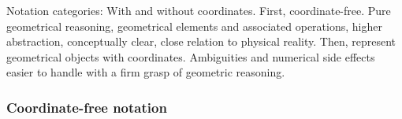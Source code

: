 %
%
%
%
% 
%

 Notation categories: With and without coordinates. First, coordinate-free. Pure geometrical reasoning, geometrical elements and associated operations, higher abstraction, conceptually clear, close relation to physical reality. Then, represent geometrical objects with coordinates. Ambiguities and numerical side effects easier to handle with a firm grasp of geometric reasoning.



\subsubsection{Coordinate-free notation}\label{IV_sec:free_notation}


